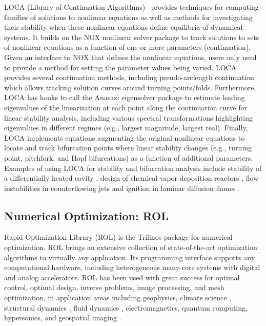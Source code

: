 LOCA (Library of Continuation Algorithms)~\cite{Salinger2005}
provides techniques for computing families of solutions to nonlinear equations as well as methods for investigating their stability when these nonlinear equations define equilibria of dynamical systems.  It builds on the NOX nonlinear solver package to track solutions to sets of nonlinear equations as a function of one or more parameters (continuation).
Given an interface to NOX that defines the nonlinear equations, users only need to provide a method for setting the parameter values being varied.
LOCA provides several continuation methods, including pseudo-arclength continuation which allows tracking solution curves around turning points/folds.  Furthermore, LOCA has hooks to call the Anasazi eigensolver package to estimate leading eigenvalues of the linearization at each point along the continuation curve for linear stability analysis, including various spectral transformations highlighting eigenvalues in different regimes (e.g., largest magnitude, largest real).  Finally, LOCA implements equations augmenting the original nonlinear equations to locate and track bifurcation points where linear stability changes (e.g., turning point, pitchfork, and Hopf bifurcations) as a function of additional parameters. Examples of using LOCA for stability and bifurcation analysis include stability of a differentially heated cavity \cite{Salinger2002}, design of chemical vapor deposition reactors \cite{Pawlowski2001}, flow instabilities in counterflowing jets \cite{pawlowski_salinger_shadid_mountziaris_2006} and ignition in laminar diffusion flames \cite{Shadid20061846}.



\subsection{Numerical Optimization: ROL}
Rapid Optimization Library (ROL) \cite{rol,ROL2022ICCOPT} is the
Trilinos package for numerical optimization. ROL brings an extensive
collection of state-of-the-art optimization algorithms to virtually
any application. Its programming interface supports any computational
hardware, including heterogeneous many-core systems with digital and
analog accelerators.
ROL has been used with great success for optimal control, optimal design,
inverse problems, image processing, and mesh optimization, in application
areas including geophysics, climate science \cite{Perego2022}, structural
dynamics \cite{AQUINO2019323,BUNTING2021107295}, fluid dynamics
\cite{Antil2023}, electromagnetics, quantum computing, hypersonics, and
geospatial imaging \cite{Kouri2014}.

